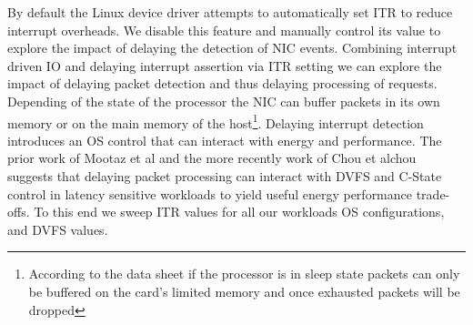 By default the Linux device driver attempts to automatically set ITR to reduce interrupt overheads.  We disable this feature and manually control its value to explore the impact of delaying the detection of NIC events.  Combining interrupt driven IO and delaying interrupt assertion via ITR setting we can explore the impact of delaying packet detection and thus delaying processing of requests.  Depending of the state of the processor the NIC can buffer packets in its own memory or on the main memory of the host\footnote{According to the data sheet if the processor is in sleep state packets can only be buffered on the card's limited memory and once exhausted packets will be dropped}.  Delaying interrupt detection introduces an OS control that can interact with energy and performance.  The prior work of Mootaz et al\cite{mootaz} and the more recently work of Chou et al{chou} suggests that delaying packet processing can interact with DVFS and C-State control in latency sensitive workloads to yield useful energy performance trade-offs. To this end we sweep ITR values for all our workloads OS configurations, and DVFS values.



%
%
%
%
